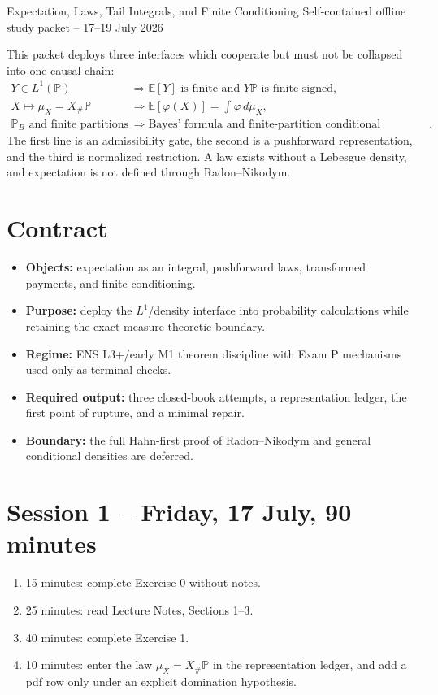 \sheettitle
  {Expectation, Laws, Tail Integrals, and Finite Conditioning}
  {Self-contained offline study packet -- 17--19 July 2026}

This packet deploys three interfaces which cooperate but must not be collapsed into one causal chain:
\[
\begin{aligned}
Y\in L^1(\mathbb P)
&\Longrightarrow
\mathbb E[Y]\text{ is finite and }Y\mathbb P\text{ is finite signed},\\
X\longmapsto\mu_X=X_\#\mathbb P
&\Longrightarrow
\mathbb E[\varphi(X)]=\int\varphi\,d\mu_X,\\
\mathbb P_B\text{ and finite partitions}
&\Longrightarrow
\text{Bayes' formula and finite-partition conditional expectation}.
\end{aligned}
\]
The first line is an admissibility gate, the second is a pushforward representation, and the third is normalized restriction. A law exists without a Lebesgue density, and expectation is not defined through Radon--Nikodym.

\section*{Contract}

\begin{itemize}
  \item \textbf{Objects:} expectation as an integral, pushforward laws, transformed payments, and finite conditioning.
  \item \textbf{Purpose:} deploy the $L^1$/density interface into probability calculations while retaining the exact measure-theoretic boundary.
  \item \textbf{Regime:} ENS L3+/early M1 theorem discipline with Exam P mechanisms used only as terminal checks.
  \item \textbf{Required output:} three closed-book attempts, a representation ledger, the first point of rupture, and a minimal repair.
  \item \textbf{Boundary:} the full Hahn-first proof of Radon--Nikodym and general conditional densities are deferred.
\end{itemize}

\section*{Session 1 -- Friday, 17 July, 90 minutes}

\begin{enumerate}
  \item 15 minutes: complete Exercise 0 without notes.
  \item 25 minutes: read Lecture Notes, Sections 1--3.
  \item 40 minutes: complete Exercise 1.
  \item 10 minutes: enter the law $\mu_X=X_\#\mathbb P$ in the representation ledger, and add a pdf row only under an explicit domination hypothesis.
\end{enumerate}

